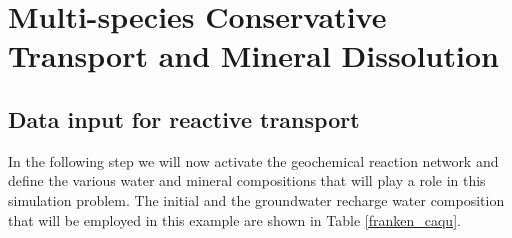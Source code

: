 \section[Multi-species Conservative Transport and Mineral Dissolution]{Multi-species Conservative Transport and Mineral Dissolution}

\subsection[Data input for reactive transport]{Data input for reactive transport}

In the following step we will now activate the geochemical reaction network and define the various water and mineral compositions that will play a role in this simulation problem. The initial and the groundwater recharge water composition that will be employed in this example are shown in Table \ref{franken_caqu}. 

